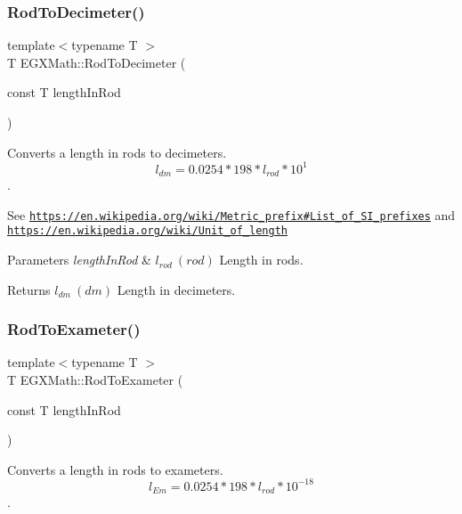 \subsubsection{\texorpdfstring{Rod\+To\+Decimeter()}{RodToDecimeter()}}
{\footnotesize\ttfamily template$<$typename T $>$ \\
T E\+G\+X\+Math\+::\+Rod\+To\+Decimeter (\begin{DoxyParamCaption}\item[{const T}]{length\+In\+Rod }\end{DoxyParamCaption})}



Converts a length in rods to decimeters. \[ l_{dm}=0.0254 * 198 * l_{rod} * 10^{1} \]. 

See \href{https://en.wikipedia.org/wiki/Metric_prefix#List_of_SI_prefixes}{\tt https\+://en.\+wikipedia.\+org/wiki/\+Metric\+\_\+prefix\#\+List\+\_\+of\+\_\+\+S\+I\+\_\+prefixes} and \href{https://en.wikipedia.org/wiki/Unit_of_length}{\tt https\+://en.\+wikipedia.\+org/wiki/\+Unit\+\_\+of\+\_\+length} 
\begin{DoxyParams}{Parameters}
{\em length\+In\+Rod} & $ l_{rod}\ (rod)$ Length in rods. \\
\hline
\end{DoxyParams}
\begin{DoxyReturn}{Returns}
$ l_{dm}\ (dm)$ Length in decimeters. 
\end{DoxyReturn}
\mbox{\label{group___e_g_x_math-_conversions-_length_conversions-_imperial-_rod-_s_i_ga2e5ab24819c55373287494675f74f3a9}} 
\subsubsection{\texorpdfstring{Rod\+To\+Exameter()}{RodToExameter()}}
{\footnotesize\ttfamily template$<$typename T $>$ \\
T E\+G\+X\+Math\+::\+Rod\+To\+Exameter (\begin{DoxyParamCaption}\item[{const T}]{length\+In\+Rod }\end{DoxyParamCaption})}



Converts a length in rods to exameters. \[ l_{Em}=0.0254 * 198 * l_{rod} * 10^{-18} \]. 

